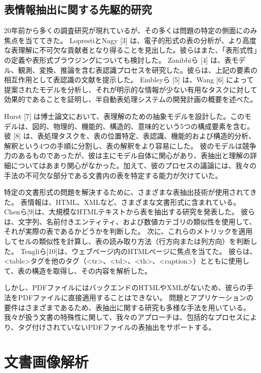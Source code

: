 \documentclass[uplatex, twocolumn,10pt]{jsarticle}
\begin{document}
\subsection{表情報抽出に関する先駆的研究}
20年前から多くの調査研究が現れているが、その多くは問題の特定の側面にのみ焦点を当ててきた。
LoprestiとNagy [3] は、電子的形式の表の分析が、より高度な表理解に不可欠な貢献者となり得ることを見出した。彼らはまた、「表形式性」の定義や表形式ブラウジングについても検討した。
Zanibbiら [4] は、表モデル、観測、変換、推論を含む表認識プロセスを研究した。彼らは、上記の要素の相互作用として表認識の文献を提示した。
Embleyら [5] は、Wang [6] によって提案されたモデルを分析し、それが明示的な情報が少ない有用なタスクに対して効果的であることを証明し、半自動表処理システムの開発計画の概要を述べた。

Hurst [7] は博士論文において、表理解のための抽象モデルを設計した。このモデルは、図的、物理的、機能的、構造的、意味的という5つの構成要素を含む。
彼 [8] は、表処理タスクを、表の位置特定、表認識、機能的および構造的分析、解釈という4つの手順に分割し、表の解釈をより容易にした。
彼のモデルは競争力のあるものであったが、彼は主にモデル自体に関心があり、表抽出と理解の詳細についてはあまり関心がなかった。加えて、彼のプロセスの議論には、我々の手法の不可欠な部分である文書内の表を特定する能力が欠けていた。

特定の文書形式の問題を解決するために、さまざまな表抽出技術が使用されてきた。
表情報は、HTML、XMLなど、さまざまな文書形式に含まれている。
Chenら[9]は、大規模なHTMLテキストから表を抽出する研究を発表した。
彼らは、文字列、名前付きエンティティ、および数値カテゴリの類似性を使用して、それが実際の表であるかどうかを判断した。
次に、これらのメトリックを適用してセルの類似性を計算し、表の読み取り方法（行方向または列方向）を判断した。
Tengliら[10]は、ウェブページ内のHTMLページに焦点を当てた。
彼らは、<table>タグを他のタグ（<tr>、<td>、<th>、<caption>）とともに使用して、表の構造を取得し、その内容を解析した。

しかし、PDFファイルにはバックエンドのHTMLやXMLがないため、彼らの手法をPDFファイルに直接適用することはできない。
問題とアプリケーションの要件はさまざまであるため、表抽出に関する研究も多様な手法を用いている。
我々が扱う文書の特殊性に関して、我々のアプローチは、包括的なプロセスにより、タグ付けされていないPDFファイルの表抽出をサポートする。





\section{文書画像解析}
\end{document}

